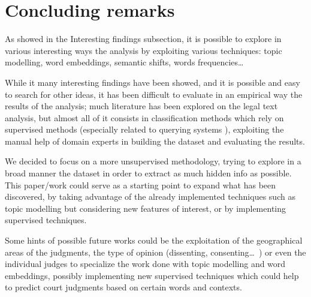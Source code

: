 \section{Concluding remarks}
As showed in the Interesting findings subsection, it is possible to explore
in various interesting ways the analysis by exploiting various techniques: topic modelling, word embeddings, semantic
shifts, words frequencies\ldots

While it many interesting findings have been showed, and it is possible and easy to search for other ideas, it has
been difficult to evaluate in an empirical way the results of the analysis; much literature has been explored on the
legal text analysis, but almost all of it consists in classification methods which rely on supervised methods
(especially related to querying systems \cite{caselaw_query}),
exploiting the manual help of domain experts in building the dataset and evaluating the results.

We decided to focus on a more unsupervised methodology, trying to explore in a broad manner the dataset in order to
extract as much hidden info as possible. This paper/work could serve as a starting point to expand what has been
discovered, by taking advantage of the already implemented techniques such as topic modelling but considering new
features of interest, or by implementing supervised techniques.

Some hints of possible future works could be the exploitation of the geographical areas of the judgments, the type of
opinion (dissenting, consenting\ldots~\cite{argumentation_mining}) or even the individual judges to specialize the work done with topic modelling
and word embeddings, possibly implementing new supervised techniques which could help to predict court judgments
based on certain words and contexts.
